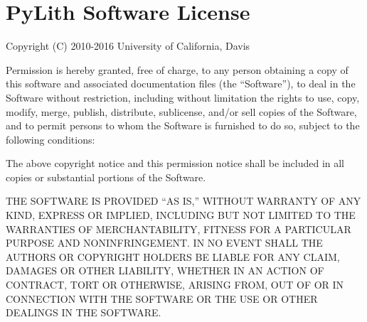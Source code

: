 
\chapter{PyLith Software License}

Copyright (C) 2010-2016 University of California, Davis

Permission is hereby granted, free of charge, to any person obtaining
a copy of this software and associated documentation files (the ``Software''),
to deal in the Software without restriction, including without limitation
the rights to use, copy, modify, merge, publish, distribute, sublicense,
and/or sell copies of the Software, and to permit persons to whom
the Software is furnished to do so, subject to the following conditions:

The above copyright notice and this permission notice shall be included
in all copies or substantial portions of the Software.

THE SOFTWARE IS PROVIDED ``AS IS,'' WITHOUT WARRANTY OF ANY KIND,
EXPRESS OR IMPLIED, INCLUDING BUT NOT LIMITED TO THE WARRANTIES OF
MERCHANTABILITY, FITNESS FOR A PARTICULAR PURPOSE AND NONINFRINGEMENT.
IN NO EVENT SHALL THE AUTHORS OR COPYRIGHT HOLDERS BE LIABLE FOR ANY
CLAIM, DAMAGES OR OTHER LIABILITY, WHETHER IN AN ACTION OF CONTRACT,
TORT OR OTHERWISE, ARISING FROM, OUT OF OR IN CONNECTION WITH THE
SOFTWARE OR THE USE OR OTHER DEALINGS IN THE SOFTWARE. 
